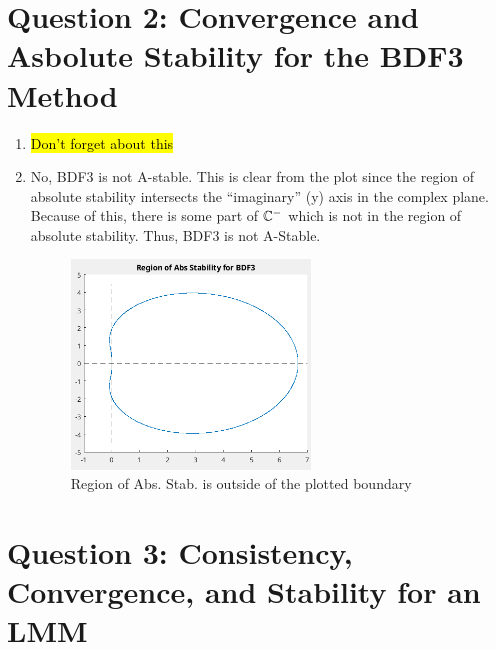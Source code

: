 \documentclass{article}
\begin{document}
\section*{Question 2: Convergence and Asbolute Stability for the BDF3 Method}

\begin{enumerate}[label=\alph*)]

  \item \hl{Don't forget about this}

  \item No, BDF3 is not A-stable. This is clear from the plot since the region
  of absolute stability intersects the ``imaginary'' (y) axis in the complex
  plane. Because of this, there is some part of $\mathbb{C}^-$ which is not in the
  region of absolute stability. Thus, BDF3 is not A-Stable.

  \begin{figure}[h]
    \centering
    \includegraphics[width=0.6\textwidth]{2bAbsStabReg.png}
    \caption{Region of Abs. Stab. is outside of the plotted boundary}
  \end{figure}

\end{enumerate}

\section*{Question 3: Consistency, Convergence, and Stability for an LMM}
\end{document}

